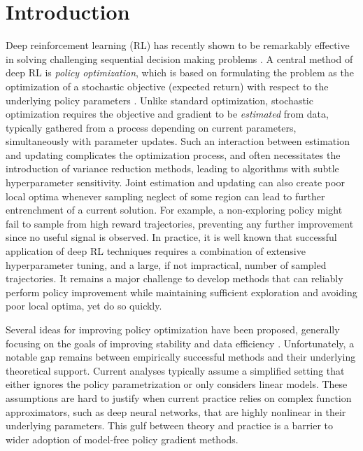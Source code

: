 
\section{Introduction}
\label{sec:intro}


Deep reinforcement learning (RL) has recently shown to be remarkably effective in solving
challenging sequential decision making problems
\citep{schulman2015trust,mnih2015human,silver2016mastering}.
A central method of deep RL is \emph{policy optimization},
which is based on formulating the problem
as the optimization of a stochastic objective (expected return)
with respect to the underlying policy parameters
\citep{williams1991function,williams1992simple,sutton1998reinforcement}.
Unlike standard optimization,
stochastic optimization requires the objective and gradient to be 
\emph{estimated} from data,
typically gathered from a process depending on current parameters, 
simultaneously with parameter updates.
Such an interaction between estimation and updating
complicates the optimization process,
and often necessitates the introduction of variance reduction methods,
leading to algorithms with subtle hyperparameter sensitivity.
Joint estimation and updating can also create poor local optima
whenever sampling neglect of some region
can lead to further entrenchment of a current solution.
For example, a non-exploring policy might fail to sample from high
reward trajectories,
preventing any further improvement since no useful signal is observed.
In practice, it is well known that successful application of deep RL techniques
requires a combination of extensive hyperparameter tuning,
and a large, if not impractical, number of sampled trajectories.
It remains a major challenge to develop methods that can reliably
perform policy improvement while maintaining sufficient exploration
and avoiding poor local optima, yet do so quickly.

Several ideas for improving policy optimization have been proposed, 
generally focusing on the goals of improving stability and data efficiency
\citep{peters2010relative,van2015learning,fox2015taming,schulman2015trust,montgomery2016guided,nachum2017bridging,nachum2017trust,tangkaratt2017guide,abdolmaleki2018maximum,haarnoja2018soft}. 
Unfortunately, a notable gap remains between empirically successful methods 
and their underlying theoretical support.
Current analyses typically assume a simplified setting that either ignores the 
policy parametrization or only considers linear models.
These assumptions are hard to justify when current practice relies on 
complex function approximators, such as deep neural networks,
that are highly nonlinear in their underlying parameters.
This gulf between theory and practice is
a barrier to wider adoption of model-free policy gradient methods.

